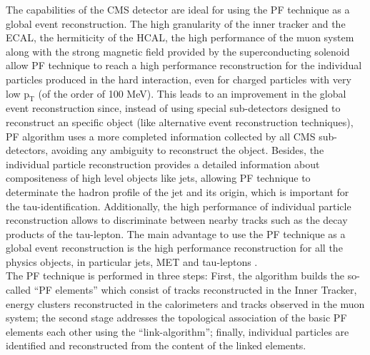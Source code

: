 The capabilities of the CMS detector are ideal for using the PF technique as a global event reconstruction. The high 
granularity of the inner tracker and the ECAL, the hermiticity of the HCAL, the high performance of the muon system 
along with the strong magnetic field provided by the superconducting solenoid allow PF technique to reach a 
high performance reconstruction for the individual particles produced in the hard interaction, even for charged particles
with very low $\textrm{p}_{\textrm{T}}$ (of the order of 100 MeV). This leads to an improvement in the global event 
reconstruction since, instead of using special sub-detectors designed to reconstruct an specific 
object (like alternative event reconstruction techniques), PF algorithm uses a more completed information collected 
by all CMS sub-detectors, avoiding any ambiguity to reconstruct the object. Besides, the 
individual particle reconstruction provides a detailed information 
about compositeness of high level objects like jets, allowing PF technique
to determinate the hadron profile of the jet and its origin, which is important for the tau-identification. 
Additionally, the high performance of individual particle reconstruction allows to discriminate between nearby tracks 
such as the decay products of the tau-lepton. The main advantage 
to use the PF technique as a global event reconstruction is the high performance reconstruction 
for all the physics objects, in particular jets, MET and tau-leptons \cite{CMS-PAS-PFT-10-001}.\\


The PF technique is performed in three steps: First, the algorithm builds the so-called ``PF elements'' which consist of tracks 
reconstructed in the Inner Tracker, energy clusters reconstructed in the calorimeters and tracks observed in the muon system;
the second stage addresses the topological association of the basic PF elements each other using the ``link-algorithm''; finally,
individual particles are identified and reconstructed from the content of the linked elements. \\


